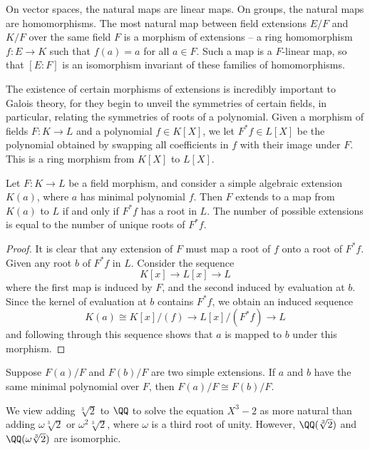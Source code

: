 On vector spaces, the natural maps are linear maps. On groups, the natural maps are homomorphisms. The most natural map between field extensions $E/F$ and $K/F$ over the same field $F$ is a morphism of extensions -- a ring homomorphism $f: E \to K$ such that $f(a) = a$ for all $a \in F$. Such a map is a $F$-linear map, so that $[E:F]$ is an isomorphism invariant of these families of homomorphisms.

The existence of certain morphisms of extensions is incredibly important to Galois theory, for they begin to unveil the symmetries of certain fields, in particular, relating the symmetries of roots of a polynomial. Given a morphism of fields $F: K \to L$ and a polynomial $f \in K[X]$, we let $F^*f \in L[X]$ be the polynomial obtained by swapping all coefficients in $f$ with their image under $F$. This is a ring morphism from $K[X]$ to $L[X]$.

\begin{lemma}
    Let $F:K \to L$ be a field morphism, and consider a simple algebraic extension $K(a)$, where $a$ has minimal polynomial $f$. Then $F$ extends to a map from $K(a)$ to $L$ if and only if $F^*f$ has a root in $L$. The number of possible extensions is equal to the number of unique roots of $F^* f$.
\end{lemma}
\begin{proof}
    It is clear that any extension of $F$ must map a root of $f$ onto a root of $F^* f$. Given any root $b$ of $F^* f$ in $L$. Consider the sequence
    \[ K[x] \to L[x] \to L \]
    where the first map is induced by $F$, and the second induced by evaluation at $b$. Since the kernel of evaluation at $b$ contains $F^* f$, we obtain an induced sequence
    \[ K(a) \cong K[x]/(f) \to L[x]/(F^* f) \to L \]
    and following through this sequence shows that $a$ is mapped to $b$ under this morphism.
\end{proof}

\begin{corollary}
	Suppose $F(a)/F$ and $F(b)/F$ are two simple extensions. If $a$ and $b$ have the same minimal polynomial over $F$, then $F(a)/F \cong F(b)/F$.
\end{corollary}

We view adding $\sqrt[3]{2}$ to $\QQ$ to solve the equation $X^3 - 2$ as more natural than adding $\omega \sqrt[3]{2}$ or $\omega^2 \sqrt[3]{2}$, where $\omega$ is a third root of unity. However, $\QQ(\sqrt[3]{2})$ and $\QQ(\omega \sqrt[3]{2})$ are isomorphic.

